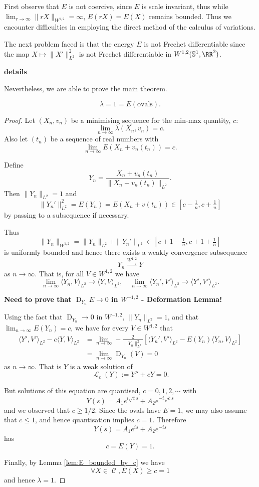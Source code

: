 \documentclass[12pt]{article}
\DeclareMathOperator{\C}{\mathcal{C}}
\DeclareMathOperator{\So}{\mathbb{S}^1}
\newcommand{\inpr}[2]{\ensuremath{\langle{#1},{#2}\rangle}}
\DeclareMathOperator{\D}{D}
\DeclareMathOperator{\EL}{\mathcal{L}}
\begin{document}
First observe that \(E\) is not coercive, since \(E\) is scale invariant, thus while \(\lim_{r\to \infty} \|rX\|_{W^{1,2}} = \infty\), \(E(r X) = E(X)\) remains bounded. Thus we encounter difficulties in employing the direct method of the calculus of variations.

The next problem faced is that the energy \(E\) is not Frechet differentiable since the map \(X \mapsto \|X'\|_{L^2}^2\) is not Frechet differentiable in \(W^{1,2} (\So, \RR^2)\).

\textbf{details}

Nevertheless, we are able to prove the main theorem.

\begin{theorem}
\[
\lambda = 1 = E(\text{ovals}).
\]
\end{theorem}

\begin{proof}
Let \((X_n, v_n)\) be a minimising sequence for the min-max quantity, \(c\):
\[
\lim_{n \to \infty} \lambda(X_n, v_n) = c.
\]
Also let \((t_n)\) be a sequence of real numbers with
\[
\lim_{n\to \infty} E(X_n + v_n(t_n)) = c.
\]

Define
\[
Y_n = \frac{X_n + v_n(t_n)}{\|X_n + v_n(t_n)\|_{L^2}}.
\]
Then \(\|Y_n\|_{L^2} = 1\) and
\[
\|Y_n'\|_{L^2}^2 = E(Y_n) = E(X_n + v(t_n)) \in [c-\tfrac{1}{n}, c + \tfrac{1}{n}]
\]
by passing to a subsequence if necessary.

Thus
\[
\|Y_n\|_{W^{1,2}} = \|Y_n\|_{L^2} + \|Y_n'\|_{L^2} \in [c+1-\tfrac{1}{n}, c + 1 + \tfrac{1}{n}]
\]
is uniformly bounded and hence there exists a weakly convergence subsequence
\[
Y_n \overset{W^{1,2}}{\rightharpoonup} Y
\]
as \(n \to \infty\). That is, for all \(V \in W^{1,2}\) we have
\[
\lim_{n\to \infty} \inpr{Y_n}{V}_{L^2} \to \inpr{Y}{V}_{L^2}, \quad \lim_{n\to \infty} \inpr{Y_n'}{V'}_{L^2} \to \inpr{Y'}{V'}_{L^2}.
\]

\textbf{Need to prove that \(\D_{Y_n} E \to 0\) in \(W^{-1,2}\) - Deformation Lemma!}

Using the fact that \(\D_{Y_n} \to 0\) in \(W^{-1,2}\), \(\|Y_n\|_{L^2} = 1\), and that \(\lim_{n\to\infty} E(Y_n) = c\), we have for every \(V \in W^{1,2}\) that
\[
\begin{split}
\inpr{Y'}{V'}_{L^2} - c \inpr{Y}{V}_{L^2} &= \lim_{n\to \infty} -\frac{2}{\|Y_n\|_{L^2}^2} \left[\inpr{Y_n'}{V'}_{L^2} - E(Y_n) \inpr{Y_n}{V}_{L^2}\right] \\
&= \lim_{n\to \infty} \D_{Y_n} (V) = 0
\end{split}
\]
as \(n \to \infty\). That is \(Y\) is a weak solution of
\[
\EL_c(Y) := Y'' + c Y = 0.
\]

But solutions of this equation are quantised, \(c = 0, 1, 2, \cdots\) with
\[
Y(s) = A_1 e^{i \sqrt{c} s} + A_2 e^{-i \sqrt{c} s}
\]
and we observed that \(c \geq 1/2\). Since the ovals have \(E = 1\), we may also assume that \(c \leq 1\), and hence quantisation implies \(c = 1\). Therefore
\[
Y(s) = A_1 e^{is} + A_2 e^{-is}
\]
has
\[
c = E(Y) = 1.
\]

Finally, by Lemma \ref{lem:E_bounded_by_c} we have
\[
\forall X \in \C, E(X) \geq c = 1
\]
and hence \(\lambda = 1\).
\end{proof}
\end{document}
